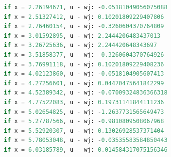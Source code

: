 \documentclass[11pt]{article}
\begin{document}
\begin{lstlisting}[language=Python]
if x = 2.26194671, u - wj: -0.05181049056075088
if x = 2.51327412, u - wj: 0.10201809229407806
if x = 2.76460154, u - wj: -0.3260604370764809
if x = 3.01592895, u - wj: 2.2444206483437013
if x = 3.26725636, u - wj: 2.244420648343697
if x = 3.51858377, u - wj: -0.3260604370764926
if x = 3.76991118, u - wj: 0.10201809229408236
if x = 4.02123860, u - wj: -0.0518104905607413
if x = 4.27256601, u - wj: 0.04470475641842299
if x = 4.52389342, u - wj: -0.07009324836366318
if x = 4.77522083, u - wj: 0.19731141844111236
if x = 5.02654825, u - wj: -1.2637731565649473
if x = 5.27787566, u - wj: -0.9810809508067968
if x = 5.52920307, u - wj: 0.13026928537371404
if x = 5.78053048, u - wj: -0.03535583584850443
if x = 6.03185789, u - wj: 0.014584317075156346
    \end{lstlisting}
    
    
\end{document}
